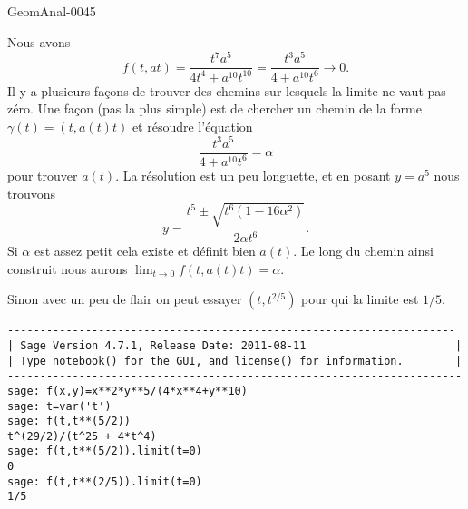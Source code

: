 \begin{corrige}{GeomAnal-0045}

            Nous avons
            \begin{equation}
                f(t,at)=\frac{ t^7a^5 }{ 4t^4+a^{10}t^{10} }=\frac{ t^3a^5 }{ 4+a^{10}t^6 }\to 0.
            \end{equation}
            Il y a plusieurs façons de trouver des chemins sur lesquels la limite ne vaut pas zéro. Une façon (pas la plus simple) est de chercher un chemin de la forme \( \gamma(t)=(t,a(t)t)\) et résoudre l'équation
            \begin{equation}
                \frac{ t^3a^5 }{ 4+a^{10}t^6 }=\alpha               
            \end{equation}
            pour trouver \( a(t)\). La résolution est un peu longuette, et en posant \( y=a^5\) nous trouvons
            \begin{equation}
                y=\frac{ t^5\pm\sqrt{t^6(1-16\alpha^2)} }{ 2\alpha t^6 }.
            \end{equation}
            Si \( \alpha\) est assez petit cela existe et définit bien \( a(t)\). Le long du chemin ainsi construit nous aurons \( \lim_{t\to 0} f(t,a(t)t)=\alpha\).

            Sinon avec un peu de flair on peut essayer \( (t,t^{2/5})\) pour qui la limite est \( 1/5\).

            \begin{verbatim}
---------------------------------------------------------------------
| Sage Version 4.7.1, Release Date: 2011-08-11                       |
| Type notebook() for the GUI, and license() for information.        |
----------------------------------------------------------------------
sage: f(x,y)=x**2*y**5/(4*x**4+y**10)
sage: t=var('t')
sage: f(t,t**(5/2))
t^(29/2)/(t^25 + 4*t^4)
sage: f(t,t**(5/2)).limit(t=0)
0
sage: f(t,t**(2/5)).limit(t=0)
1/5
            \end{verbatim}

\end{corrige}
